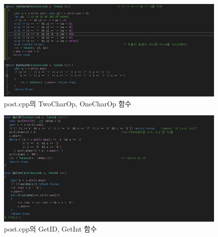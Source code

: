 \documentclass[a4paper,12pt]{article}
\begin{document}
    \begin{figure}[t]\vspace*{4pt} 
    \centerline{\includegraphics[width=1.0\columnwidth]{f4}} 
    \caption{post.cpp의 TwoCharOp, OneCharOp 함수}\vspace*{-6pt} 
    \label{figure:f4} 
    \end{figure} 
    
    \begin{figure}[t]\vspace*{4pt} 
        \centerline{\includegraphics[width=1.0\columnwidth]{f5}} 
        \caption{post.cpp의 GetID, GetInt 함수}\vspace*{-6pt} 
        \label{figure:f5} 
        \end{figure} 
        
    
\end{document}

